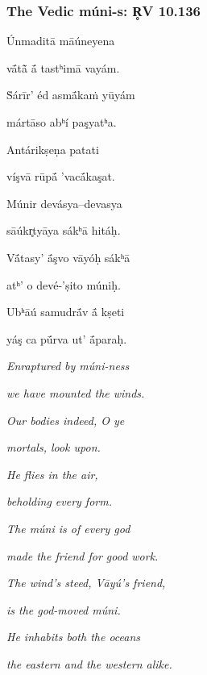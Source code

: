 \documentclass[pdf]{beamer}
\begin{document}
\begin{frame} \frametitle{The Vedic múni-s: R̥V 10.136}
\begin{center}
\begin{multicols}{2}
\scriptsize{
	Únmaditā māúneyena

	vā́tā̃ ā́ tastʰimā vayám.

	Ṡárīr' éd asmā́kaṁ yūyám

	mártāso abʰí paşyatʰa.

	\vspace{\baselineskip}

	Antárikṣeṇa patati

	víşvā rūpā́ 'vacā́kaşat.

	Múnir devásya--devasya

	sāúkr̥tyāya sákʰā hitáḥ.

	\vspace{\baselineskip}

	Vā́tasy' ā́şvo vāyóḥ sákʰā

	atʰ' o devé-'ṣito múniḥ.

	Ubʰāú samudrā́v ā́ kṣeti

	yáş ca pū́rva ut' ā́paraḥ.

	\columnbreak

	\textit{Enraptured by múni-ness}

	\textit{we have mounted the winds.}

	\textit{Our bodies indeed, O ye}

	\textit{mortals, look upon.}

	\vspace{\baselineskip}

	\textit{He flies in the air,}

	\textit{beholding every form.}

	\textit{The múni is of every god}

	\textit{made the friend for good work.}

	\vspace{\baselineskip}

	\textit{The wind's steed, Vāyú's friend,}

	\textit{is the god-moved múni.}

	\textit{He inhabits both the oceans}

	\textit{the eastern and the western alike.}
}
\end{multicols}
\end{center}
\end{frame}
\end{document}
